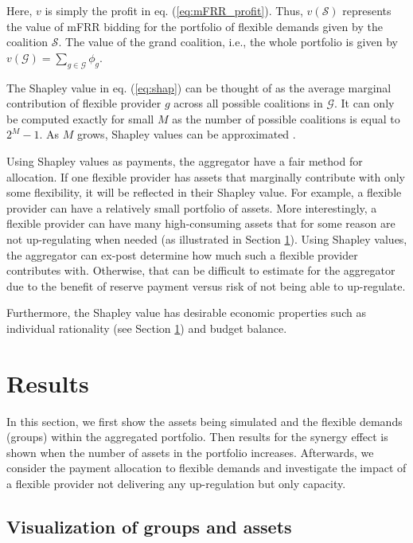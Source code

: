 \documentclass[lettersize,journal]{IEEEtran}
\begin{document}
Here, $v$ is simply the profit in eq. (\ref{eq:mFRR_profit}). Thus, $v(\mathcal{S})$ represents the value of mFRR bidding for the portfolio of flexible demands given by the coalition $\mathcal{S}$. The value of the grand coalition, i.e., the whole portfolio is given by $v(\mathcal{G}) = \sum_{g \in \mathcal{G}} \phi_{g}$.

The Shapley value  in eq. (\ref{eq:shap}) can be thought of as the average marginal contribution of flexible provider $g$ across all possible coalitions in $\mathcal{G}$. It can only be computed exactly for small $M$ as the number of possible coalitions is equal to $2^{M} - 1$. As $M$ grows, Shapley values can be approximated \cite{castro2009polynomial}.

Using Shapley values as payments, the aggregator have a fair method for allocation. If one flexible provider has assets that marginally contribute with only some flexibility, it will be reflected in their Shapley value. For example, a flexible provider can have a relatively small portfolio of assets. More interestingly, a flexible provider can have many high-consuming assets that for some reason are not up-regulating when needed (as illustrated in Section \ref{sec:Results}). Using Shapley values, the aggregator can ex-post determine how much such a flexible provider contributes with. Otherwise, that can be difficult to estimate for the aggregator due to the benefit of reserve payment versus risk of not being able to up-regulate.

Furthermore, the Shapley value has desirable economic properties such as individual rationality (see Section \ref{sec:Results}) and budget balance.

\section{Results}\label{sec:Results}

In this section, we first show the assets being simulated and the flexible demands (groups) within the aggregated portfolio. Then results for the synergy effect is shown when the number of assets in the portfolio increases. Afterwards, we consider the payment allocation to flexible demands and investigate the impact of a flexible provider not delivering any up-regulation but only capacity.

\subsection{Visualization of groups and assets}
\end{document}
